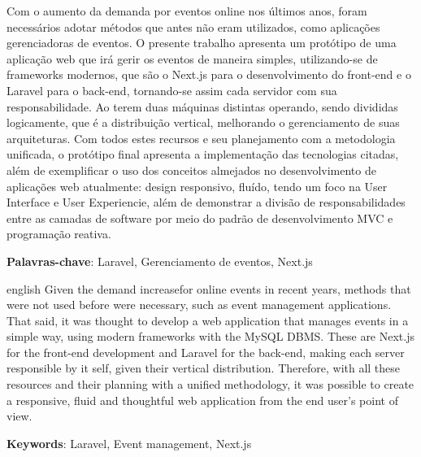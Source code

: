 \documentclass[
	12pt,			%
	openany,		%
	oneside,		%
	a4paper,		%
	english,		%
	brazil			%
	]{abntex2}
\begin{document}
\setlength{\absparsep}{18pt} %

\begin{resumo}
Com o aumento da demanda por eventos online nos últimos anos, foram necessários adotar métodos que antes não eram utilizados, como aplicações gerenciadoras de eventos. O presente trabalho apresenta um protótipo de uma aplicação web que irá gerir os eventos de maneira simples, utilizando-se de frameworks modernos, que são o Next.js para o desenvolvimento do front-end e o Laravel para o back-end, tornando-se assim cada servidor com sua responsabilidade. Ao terem duas máquinas distintas operando, sendo divididas logicamente, que é a distribuição vertical, melhorando o gerenciamento de suas arquiteturas. Com todos estes recursos e seu planejamento com a metodologia unificada, o protótipo final apresenta a implementação das tecnologias citadas, além de exemplificar o uso dos conceitos almejados no desenvolvimento de aplicações web atualmente: design responsivo, fluído, tendo um foco na User Interface e User Experiencie, além de demonstrar a divisão de responsabilidades entre as camadas de software por meio do padrão de desenvolvimento MVC e programação reativa.

\textbf{Palavras-chave}: Laravel, Gerenciamento de eventos, Next.js
\end{resumo}

\begin{resumo}[Abstract]
\begin{otherlanguage*}{english}
Given the demand increasefor online events in recent years, methods that were not used before were necessary, such as event management applications. That said, it was thought to develop a web application that manages events in a simple way, using modern frameworks with the MySQL DBMS. These are Next.js for the front-end development and Laravel for the back-end, making each server responsible by it self, given their vertical distribution. Therefore, with all these resources and their planning with a unified methodology, it was possible to create a responsive, fluid and thoughtful web application from the end user's point of view.

\textbf{Keywords}: Laravel, Event management, Next.js
\end{otherlanguage*}
\end{resumo}
 


\end{document}
